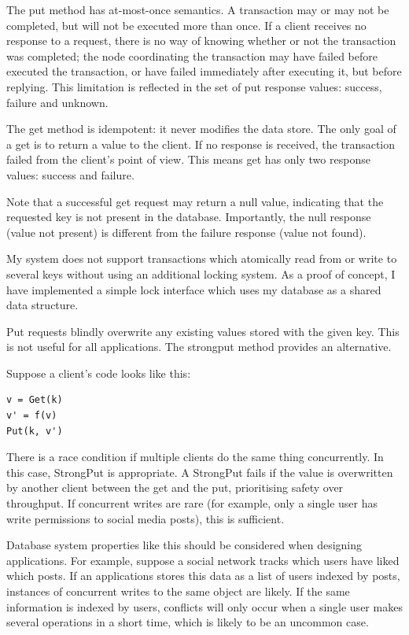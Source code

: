 \documentclass[12pt,a4paper,twoside,openany]{report}
\begin{document}
The put method has at-most-once semantics. A transaction may or may not be completed, but will not be executed more than once. If a client receives no response to a request, there is no way of knowing whether or not the transaction was completed; the node coordinating the transaction may have failed before executed the transaction, or have failed immediately after executing it, but before replying. This limitation is reflected in the set of put response values: success, failure and unknown.

The get method is idempotent: it never modifies the data store. The only goal of a get is to return a value to the client. If no response is received, the transaction failed from the client's point of view. This means get has only two response values: success and failure.

Note that a successful get request may return a null value, indicating that the requested key is not present in the database. Importantly, the null response (value not present) is different from the failure response (value not found).

My system does not support transactions which atomically read from or write to several keys without using an additional locking system. As a proof of concept, I have implemented a simple lock interface which uses my database as a shared data structure.

Put requests blindly overwrite any existing values stored with the given key. This is not useful for all applications. The strongput method provides an alternative.

Suppose a client's code looks like this:

\begin{verbatim}
v = Get(k)
v' = f(v)
Put(k, v')
\end{verbatim}

There is a race condition if multiple clients do the same thing concurrently. In this case, StrongPut is appropriate. A StrongPut fails if the value is overwritten by another client between the get and the put, prioritising safety over throughput. If concurrent writes are rare (for example, only a single user has write permissions to social media posts), this is sufficient.

Database system properties like this should be considered when designing applications. For example, suppose a social network tracks which users have liked which posts. If an applications stores this data as a list of users indexed by posts, instances of concurrent writes to the same object are likely. If the same information is indexed by users, conflicts will only occur when a single user makes several operations in a short time, which is likely to be an uncommon case.
\end{document}
